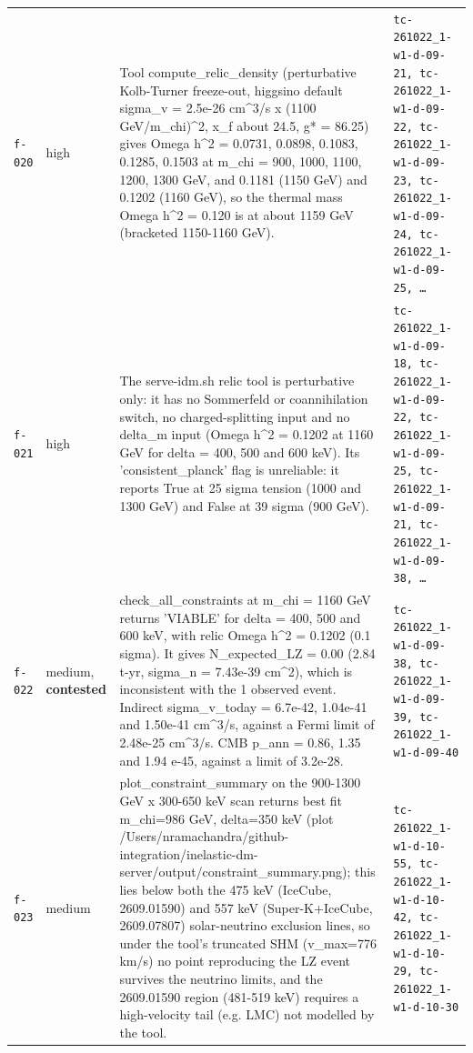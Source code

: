 \documentclass[11pt,a4paper]{article}
\begin{document}
\begin{longtable}{@{}p{}p{}p{}p{}@{}}
\texttt{f-020} & high & Tool compute\_relic\_density (perturbative Kolb-Turner freeze-out, higgsino default sigma\_v = 2.5e-26 cm\textasciicircum{}3/s x (1100 GeV/m\_chi)\textasciicircum{}2, x\_f about 24.5, g* = 86.25) gives Omega h\textasciicircum{}2 = 0.0731, 0.0898, 0.1083, 0.1285, 0.1503 at m\_chi = 900, 1000, 1100, 1200, 1300 GeV, and 0.1181 (1150 GeV) and 0.1202 (1160 GeV), so the thermal mass Omega h\textasciicircum{}2 = 0.120 is at about 1159 GeV (bracketed 1150-1160 GeV). & \texttt{tc-261022\_\allowbreak{}1-w1-d-09-21,\allowbreak{} tc-261022\_\allowbreak{}1-w1-d-09-22,\allowbreak{} tc-261022\_\allowbreak{}1-w1-d-09-23,\allowbreak{} tc-261022\_\allowbreak{}1-w1-d-09-24,\allowbreak{} tc-261022\_\allowbreak{}1-w1-d-09-25,\allowbreak{} \ldots{}\allowbreak{}} \\
\texttt{f-021} & high & The serve-idm.sh relic tool is perturbative only: it has no Sommerfeld or coannihilation switch, no charged-splitting input and no delta\_m input (Omega h\textasciicircum{}2 = 0.1202 at 1160 GeV for delta = 400, 500 and 600 keV). Its 'consistent\_planck' flag is unreliable: it reports True at 25 sigma tension (1000 and 1300 GeV) and False at 39 sigma (900 GeV). & \texttt{tc-261022\_\allowbreak{}1-w1-d-09-18,\allowbreak{} tc-261022\_\allowbreak{}1-w1-d-09-22,\allowbreak{} tc-261022\_\allowbreak{}1-w1-d-09-25,\allowbreak{} tc-261022\_\allowbreak{}1-w1-d-09-21,\allowbreak{} tc-261022\_\allowbreak{}1-w1-d-09-38,\allowbreak{} \ldots{}\allowbreak{}} \\
\texttt{f-022} & medium, \textbf{contested} & check\_all\_constraints at m\_chi = 1160 GeV returns 'VIABLE' for delta = 400, 500 and 600 keV, with relic Omega h\textasciicircum{}2 = 0.1202 (0.1 sigma). It gives N\_expected\_LZ = 0.00 (2.84 t-yr, sigma\_n = 7.43e-39 cm\textasciicircum{}2), which is inconsistent with the 1 observed event. Indirect sigma\_v\_today = 6.7e-42, 1.04e-41 and 1.50e-41 cm\textasciicircum{}3/s, against a Fermi limit of 2.48e-25 cm\textasciicircum{}3/s. CMB p\_ann = 0.86, 1.35 and 1.94 e-45, against a limit of 3.2e-28. & \texttt{tc-261022\_\allowbreak{}1-w1-d-09-38,\allowbreak{} tc-261022\_\allowbreak{}1-w1-d-09-39,\allowbreak{} tc-261022\_\allowbreak{}1-w1-d-09-40} \\
\texttt{f-023} & medium & plot\_constraint\_summary on the 900-1300 GeV x 300-650 keV scan returns best fit m\_chi=986 GeV, delta=350 keV (plot /Users/nramachandra/github-integration/inelastic-dm-server/output/constraint\_summary.png); this lies below both the 475 keV (IceCube, 2609.01590) and 557 keV (Super-K+IceCube, 2609.07807) solar-neutrino exclusion lines, so under the tool's truncated SHM (v\_max=776 km/s) no point reproducing the LZ event survives the neutrino limits, and the 2609.01590 region (481-519 keV) requires a high-velocity tail (e.g. LMC) not modelled by the tool. & \texttt{tc-261022\_\allowbreak{}1-w1-d-10-55,\allowbreak{} tc-261022\_\allowbreak{}1-w1-d-10-42,\allowbreak{} tc-261022\_\allowbreak{}1-w1-d-10-29,\allowbreak{} tc-261022\_\allowbreak{}1-w1-d-10-30} \\

\end{longtable}
\end{document}

